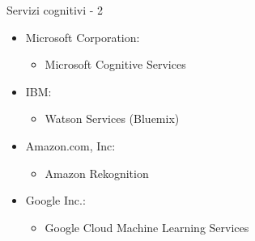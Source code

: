 %
\begin{frame}[t]{Servizi cognitivi - 2}
\begin{itemize}
	\item Microsoft Corporation:
	\begin{itemize}
		\item Microsoft Cognitive Services
	\end{itemize}
	\item IBM:
	\begin{itemize}
		\item Watson Services (Bluemix)
	\end{itemize}
	\item Amazon.com, Inc:
	\begin{itemize}
		\item Amazon Rekognition
	\end{itemize}
	\item Google Inc.:
	\begin{itemize}
		\item Google Cloud Machine Learning Services
	\end{itemize}
\end{itemize}
\end{frame}
%
